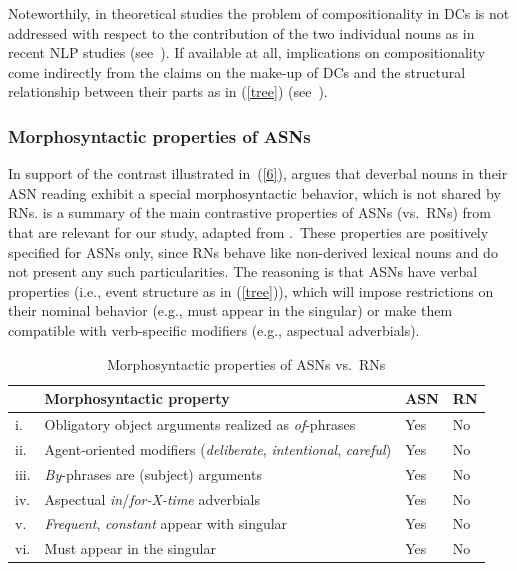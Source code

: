\documentclass[output=paper]{langsci/langscibook}
\begin{document}
Noteworthily, in theoretical studies the problem of compositionality in DCs is not addressed with respect to the contribution of the two individual nouns as in recent NLP studies (see~). If available at all, implications on compositionality come indirectly from the claims on the  make-up of DCs and the structural relationship between their  parts as in (\ref{tree}) (see~).

\subsubsection{Morphosyntactic properties of ASNs}\label{sec:properties:ASN}
 In support of the contrast illustrated in~(\ref{6}), \cite{grimshaw:90}  argues that  deverbal nouns in their ASN reading exhibit a special morphosyntactic behavior, which is not shared by RNs.
 is a summary of the main contrastive properties of ASNs (vs.~RNs) from \cite{grimshaw:90} that are relevant for our study, adapted from \citet[3]{alexiadou:grimshaw:08}.\  These properties are positively specified for ASNs only, since RNs behave like non-derived lexical nouns and do not present any such particularities. The reasoning is that ASNs have  verbal properties (i.e., event structure as in (\ref{tree})), which will impose restrictions on their nominal behavior (e.g., must  appear in the singular) or make them compatible with verb-specific modifiers (e.g., aspectual adverbials).

\begin{table}
\caption{Morphosyntactic properties of ASNs vs.\ RNs }
\label{tab:1:ASN:RN}
\begin{tabular}{|l|l|l|l|}
\hline & \textbf{Morphosyntactic property} & \textbf{ASN} & \textbf{RN}\\ \hline
i. & Obligatory object arguments realized as \textit{of}-phrases & Yes & No \\ \hline
ii. & Agent-oriented modifiers (\textit{deliberate}, \textit{intentional}, \textit{careful}) & Yes & No\\ \hline
iii. & \textit{By}-phrases are (subject) arguments &Yes & No\\ 
\hline
iv. & Aspectual \textit{in}/\textit{for-X-time} adverbials & Yes & No\\ \hline
v. &  \textit{Frequent}, \textit{constant} appear with singular & Yes & No\\ \hline
vi. & Must appear in the singular & Yes & No\\
\hline
\end{tabular}
\end{table}
\end{document}
